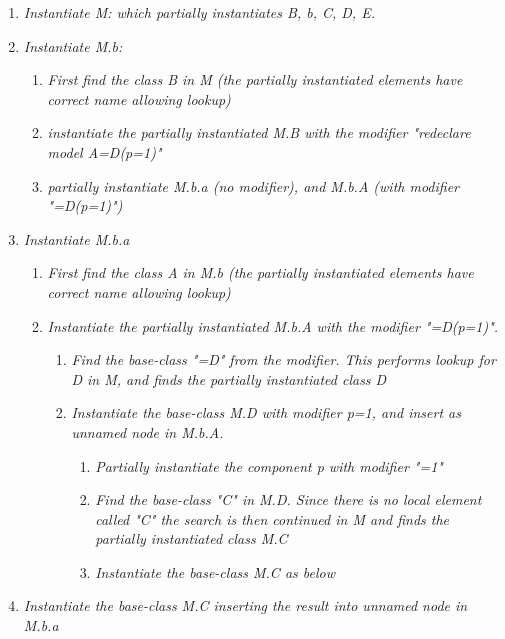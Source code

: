 \documentclass[10pt,a4paper]{report}
\begin{document}
\begin{enumerate}
\item
  \emph{Instantiate M: which partially instantiates B, b, C, D, E.}
\item
  \emph{Instantiate M.b: }

  \begin{enumerate}
  \item
    \emph{First find the class B in M (the partially instantiated
    elements have correct name allowing lookup)}
  \item
    \emph{instantiate the partially instantiated M.B with the modifier
    "redeclare model A=D(p=1)"}
  \item
    \emph{partially instantiate M.b.a (no modifier), and M.b.A (with
    modifier "=D(p=1)")}
  \end{enumerate}
\item
  \emph{Instantiate M.b.a}

  \begin{enumerate}
  \item
    \emph{First find the class A in M.b (the partially instantiated
    elements have correct name allowing lookup)}
  \item
    \emph{Instantiate the partially instantiated M.b.A with the modifier
    "=D(p=1)".}

    \begin{enumerate}
    \item
      \emph{Find the base-class "=D" from the modifier. This performs
      lookup for D in M, and finds the partially instantiated class D}
    \item
      \emph{Instantiate the base-class M.D with modifier p=1, and insert
      as unnamed node in M.b.A.}

      \begin{enumerate}
      \item
        \emph{Partially instantiate the component p with modifier "=1"}
      \item
        \emph{Find the base-class "C" in M.D. Since there is no local
        element called "C" the search is then continued in M and finds
        the partially instantiated class M.C}
      \item
        \emph{Instantiate the base-class M.C as below}
      \end{enumerate}
    \end{enumerate}
  \end{enumerate}
\item
  \emph{Instantiate the base-class M.C inserting the result into unnamed
  node in M.b.a}


\end{enumerate}
\end{document}
